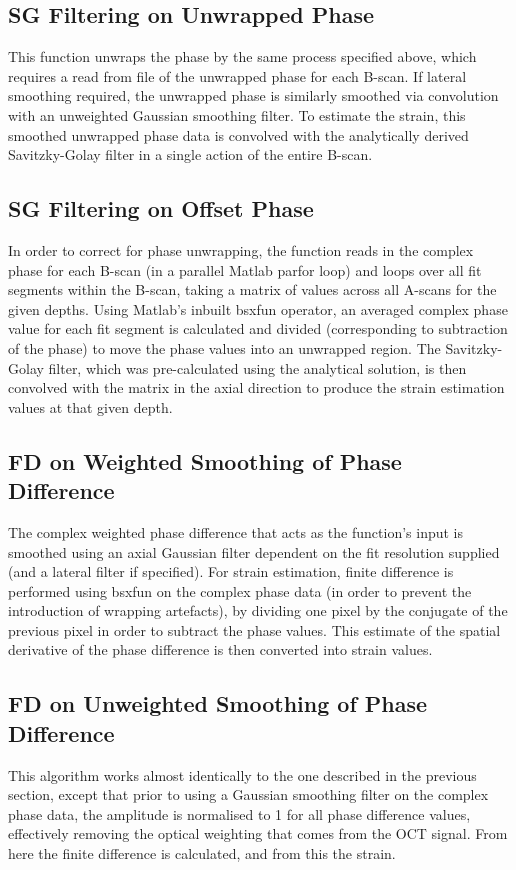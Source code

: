\subsection{SG Filtering on Unwrapped Phase}
This function unwraps the phase by the same process specified above, which requires a read from file of the unwrapped phase for each B-scan. If lateral smoothing required, the unwrapped phase is similarly smoothed via convolution with an unweighted Gaussian smoothing filter. To estimate the strain, this smoothed unwrapped phase data is convolved with the analytically derived Savitzky-Golay filter in a single action of the entire B-scan.

\subsection{SG Filtering on Offset Phase}
In order to correct for phase unwrapping, the function reads in the complex phase for each B-scan (in a parallel Matlab parfor loop) and loops over all fit segments within the B-scan, taking a matrix of values across all A-scans for the given depths. Using Matlab's inbuilt bsxfun operator, an averaged complex phase value for each fit segment is calculated and divided (corresponding to subtraction of the phase) to move the phase values into an unwrapped region. The Savitzky-Golay filter, which was pre-calculated using the analytical solution, is then convolved with the matrix in the axial direction to produce the strain estimation values at that given depth. 

\subsection{FD on Weighted Smoothing of Phase Difference}
The complex weighted phase difference that acts as the function's input is smoothed using an axial Gaussian filter dependent on the fit resolution supplied (and a lateral filter if specified). For strain estimation, finite difference is performed using bsxfun on the complex phase data (in order to prevent the introduction of  wrapping artefacts), by dividing one pixel by the conjugate of the previous pixel in order to subtract the phase values. This estimate of the spatial derivative of the phase difference is then converted into strain values.

\subsection{FD on Unweighted Smoothing of Phase Difference}
This algorithm works almost identically to the one described in the previous section, except that prior to using a Gaussian smoothing filter on the complex phase data, the amplitude is normalised to 1 for all phase difference values, effectively removing the optical weighting that comes from the OCT signal. From here the finite difference is calculated, and from this the strain. 

